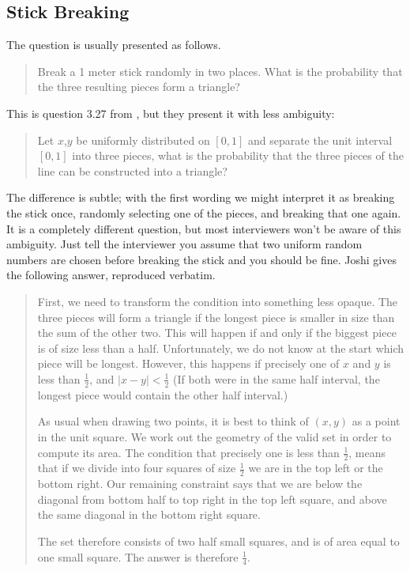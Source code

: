 \documentclass[a4paper]{article}
\begin{document}
\subsection{Stick Breaking}
\label{subsec:stickbreaking}
The question is usually presented as follows.
\begin{quote}
Break a 1 meter stick randomly in two places. What is the probability that the three resulting pieces form a triangle?
\end{quote}
This is question 3.27 from \citet{JoshiQA}, but they present it with less ambiguity:
\begin{quote}
Let $x$,$y$ be uniformly distributed on $[0, 1]$ and separate the
unit interval $[0,1]$ into three pieces, what is the probability that the three pieces of the
line can be constructed into a triangle?
\end{quote}
The difference is subtle; with the first wording we might interpret it as breaking the stick once, randomly selecting one of the pieces, and breaking that one again.
It is a completely different question, but most interviewers won't be aware of this ambiguity.
Just tell the interviewer you assume that two uniform random numbers are chosen before breaking the stick and you should be fine.
Joshi gives the following answer, reproduced verbatim.
\begin{quotation}
First, we need to transform the condition into something less opaque.
The three pieces will form a triangle if the longest piece is smaller in size than the sum of the other two.
This will happen if and only if the biggest piece is of size less than a half.
Unfortunately, we do not know at the start which piece will be longest.
However, this happens if precisely one of $x$ and $y$ is less than $\frac{1}{2}$, and $|x-y|<\frac{1}{2}$ (If both were in the same half interval, the longest piece would contain the other half interval.)

As usual when drawing two points, it is best to think of $(x,y)$ as a point in the unit square.
We work out the geometry of the valid set in order to compute its area.
The condition that precisely one is less than $\frac{1}{2}$, means that if we divide into  four squares of size $\frac{1}{2}$ we are in the top left or the bottom right.
Our remaining constraint says that we are below the diagonal from bottom half to top right in
the top left square, and above the same diagonal in the bottom right square.

The set therefore consists of two half small squares, and is of area equal to one small square.
The answer is therefore $\frac{1}{4}$.
\end{quotation}
\end{document}
